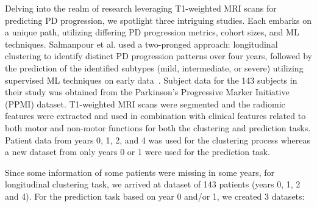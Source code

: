 


Delving into the realm of research leveraging T1-weighted MRI scans for predicting PD progression, we spotlight three intriguing studies. Each embarks on a unique path, utilizing differing 
PD progression metrics, cohort sizes, and ML techniques. Salmanpour et al. used a two-pronged approach: longitudinal clustering to identify distinct PD progression patterns over four years, 
followed by the prediction of the identified subtypes (mild, intermediate, or severe) utilizing supervised ML techniques on early data~\cite{salmanpour_mojtaba_shamsaei_ghasem_hajianfar_hamid_soltanian_zadeh_arman_rahmim_2022}. 
Subject data for the 143 subjects in their study was obtained from the Parkinson's Progressive Marker Initiative (PPMI) dataset. T1-weighted MRI scans were segmented and the radiomic features were 
extracted and used in combination with clinical features related to both motor and non-motor functions for both the clustering and prediction tasks. Patient data from years 0, 1, 2, and 4 was used for 
the clustering process whereas a new dataset from only years 0 or 1 were used for the prediction task.  


Since some 
information of some patients were missing in some years, 
for longitudinal clustering task, we arrived at dataset of 143 
patients (years 0, 1, 2 and 4). For the prediction task based 
on year 0 and/or 1, we created 3 datasets:









 
